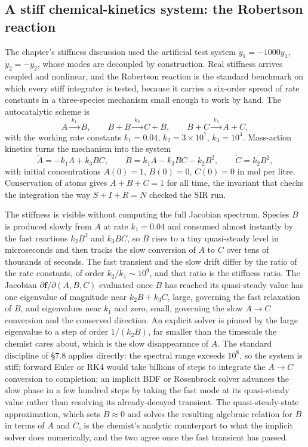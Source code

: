 \subsection{A stiff chemical-kinetics system: the Robertson reaction}

The chapter's stiffness discussion used the artificial test system
$\dot{y}_{1} = -1000 y_{1}$, $\dot{y}_{2} = -y_{2}$, whose modes are
decoupled by construction. Real stiffness arrives coupled and
nonlinear, and the Robertson reaction is the standard benchmark on
which every stiff integrator is tested, because it carries a six-order
spread of rate constants in a three-species mechanism small enough to
work by hand. The autocatalytic scheme is
\[
A \xrightarrow{\;k_{1}\;} B, \qquad
B + B \xrightarrow{\;k_{2}\;} C + B, \qquad
B + C \xrightarrow{\;k_{3}\;} A + C,
\]
with the working rate constants $k_{1} = 0.04$, $k_{2} = 3\times
10^{7}$, $k_{3} = 10^{4}$. Mass-action kinetics turns the mechanism
into the system
\[
\dot{A} = -k_{1} A + k_{3} B C, \qquad
\dot{B} = k_{1} A - k_{3} B C - k_{2} B^{2}, \qquad
\dot{C} = k_{2} B^{2},
\]
with initial concentrations $A(0) = 1$, $B(0) = 0$, $C(0) = 0$ in
mol per litre. Conservation of atoms gives $A + B + C = 1$ for all
time, the invariant that checks the integration the way $S + I + R = N$
checked the SIR run.

The stiffness is visible without computing the full Jacobian
spectrum. Species $B$ is produced slowly from $A$ at rate $k_{1} =
0.04$ and consumed almost instantly by the fast reactions
$k_{2} B^{2}$ and $k_{3} BC$, so $B$ rises to a tiny quasi-steady level
in microseconds and then tracks the slow conversion of $A$ to $C$ over
tens of thousands of seconds. The fast transient and the slow drift
differ by the ratio of the rate constants, of order $k_{2}/k_{1}
\sim 10^{9}$, and that ratio is the stiffness ratio. The Jacobian
$\partial \mathbf{f}/\partial(A, B, C)$ evaluated once $B$ has reached
its quasi-steady value has one eigenvalue of magnitude near
$k_{2} B + k_{3} C$, large, governing the fast relaxation of $B$, and
eigenvalues near $k_{1}$ and zero, small, governing the slow $A
\to C$ conversion and the conserved direction. An explicit solver is
pinned by the large eigenvalue to a step of order $1/(k_{2} B)$, far
smaller than the timescale the chemist cares about, which is the slow
disappearance of $A$. The standard discipline of \S7.8 applies
directly: the spectral range exceeds $10^{8}$, so the system is stiff;
forward Euler or RK4 would take billions of steps to integrate the
$A \to C$ conversion to completion; an implicit BDF or Rosenbrock
solver advances the slow phase in a few hundred steps by taking the
fast mode at its quasi-steady value rather than resolving its
already-decayed transient. The quasi-steady-state approximation, which
sets $\dot{B} \approx 0$ and solves the resulting algebraic relation
for $B$ in terms of $A$ and $C$, is the chemist's analytic counterpart
to what the implicit solver does numerically, and the two agree once
the fast transient has passed.

